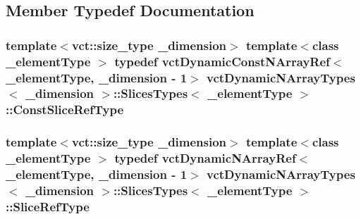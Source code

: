 \subsection{Member Typedef Documentation}
\hypertarget{classvct_dynamic_n_array_types_1_1_slices_types_acf1ea70846d0d2739fce728d3c99bde3}{
\subsubsection[{Const\-Slice\-Ref\-Type}]{\setlength{\rightskip}{0pt plus 5cm}template$<$vct\-::size\-\_\-type \-\_\-dimension$>$ template$<$class \-\_\-element\-Type $>$ typedef {\bf vct\-Dynamic\-Const\-N\-Array\-Ref}$<$\-\_\-element\-Type, \-\_\-dimension -\/ 1$>$ {\bf vct\-Dynamic\-N\-Array\-Types}$<$ \-\_\-dimension $>$\-::{\bf Slices\-Types}$<$ \-\_\-element\-Type $>$\-::{\bf Const\-Slice\-Ref\-Type}}}\label{classvct_dynamic_n_array_types_1_1_slices_types_acf1ea70846d0d2739fce728d3c99bde3}
\hypertarget{classvct_dynamic_n_array_types_1_1_slices_types_a3eac136f0c4ca03f30cf55cdd608ebf8}{
\subsubsection[{Slice\-Ref\-Type}]{\setlength{\rightskip}{0pt plus 5cm}template$<$vct\-::size\-\_\-type \-\_\-dimension$>$ template$<$class \-\_\-element\-Type $>$ typedef {\bf vct\-Dynamic\-N\-Array\-Ref}$<$\-\_\-element\-Type, \-\_\-dimension -\/ 1$>$ {\bf vct\-Dynamic\-N\-Array\-Types}$<$ \-\_\-dimension $>$\-::{\bf Slices\-Types}$<$ \-\_\-element\-Type $>$\-::{\bf Slice\-Ref\-Type}}}\label{classvct_dynamic_n_array_types_1_1_slices_types_a3eac136f0c4ca03f30cf55cdd608ebf8}


